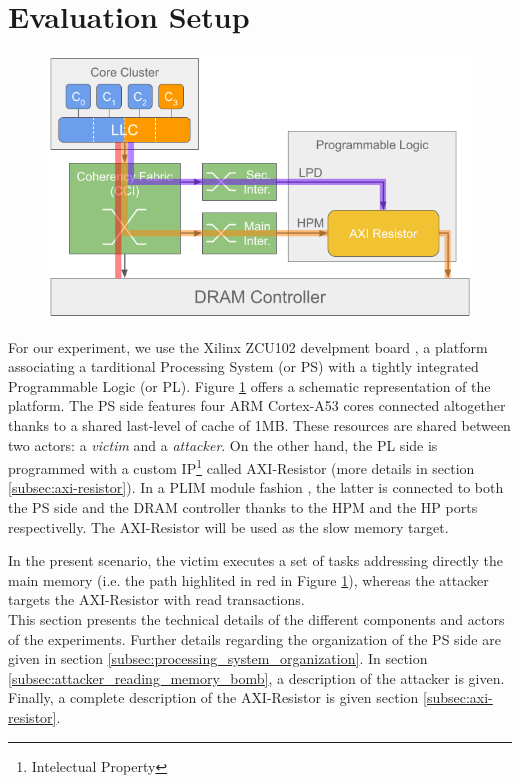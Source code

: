 \section{Evaluation Setup}
    \begin{figure}
        \centering
        \includegraphics[scale=0.35]{images/Evaluation_setup.png}
        \caption{}
        \label{fig:system_schematic}
    \end{figure}
    For our experiment, we use the Xilinx ZCU102 develpment board \cite{Xilinx-ULTRASCALE-TRM}, a platform associating a tarditional Processing System (or PS) with a tightly integrated Programmable Logic (or PL). Figure \ref{fig:system_schematic} offers a schematic representation of the platform.
    The PS side features four ARM Cortex-A53 cores \cite{ARM-cortex-A53} connected altogether thanks to a shared last-level of cache of 1MB. These resources are shared between two actors: a \emph{victim} and a \emph{attacker}. On the other hand, the PL side is programmed with a custom IP\footnote{Intelectual Property} called AXI-Resistor (more details in section \ref{subsec:axi-resistor}). In a PLIM module fashion \cite{PLIM20}, the latter is connected to both the PS side and the DRAM controller thanks to the HPM and the HP ports respectivelly. The AXI-Resistor will be used as the slow memory target.

    In the present scenario, the victim executes a set of tasks addressing directly the main memory (i.e. the path highlited in red in Figure \ref{fig:system_schematic}), whereas the attacker targets the AXI-Resistor with read transactions.\\

    This section presents the technical details of the different components and actors of the experiments. Further details regarding the organization of the PS side are given in section \ref{subsec:processing_system_organization}. In section \ref{subsec:attacker_reading_memory_bomb}, a description of the attacker is given. Finally, a complete description of the AXI-Resistor is given section \ref{subsec:axi-resistor}.

